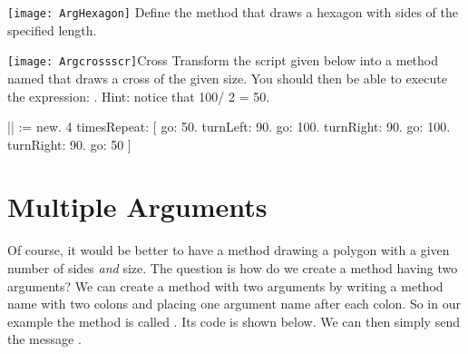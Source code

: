 \begin{exofigwithsizeandtitle}[0.5]{\texttt{[image: ArgHexagon]}}{}
  Define the method  that draws \newcommand{\replace}[2]{an}{a} hexagon with \newcommand{\replace}[2]{side of a given size}{sides of the specified length}.
\end{exofigwithsizeandtitle}

\begin{exofigwithsizeandtitle}[0.5]{\texttt{[image: Argcrossscr]}}{Cross}
Transform the script given \newcommand{\replace}[2]{hereafter}{below} into a method named  that draws a cross of \newcommand{\replace}[2]{a}{the} given size. You should then be able to execute the \newcommand{\remove}[1]{following} expression: . Hint: notice that 100/ 2 = 50.
\begin{nalltt}
|\caro|
\caro := \Turtle new.
4 timesRepeat: 
               [ \caro go: 50. 
               \caro turnLeft: 90. 
               \caro go: 100. 
               \caro turnRight: 90. 
               \caro go: 100.
               \caro turnRight: 90.
               \caro go: 50 ]

\end{nalltt}
\end{exofigwithsizeandtitle}



\section{Multiple Arguments}
Of course, it would be \newcommand{\replace}[2]{best}{better} to have a method drawing a polygon \newcommand{\replace}[2]{of}{with a} given number of sides
\emph{and} size. The \newcommand{\replace}[2]{problem}{question} is how \newcommand{\replace}[2]{to}{do we} create a method having two arguments\newcommand{\replace}[2]{?Creating}{?  We can create} a method with two arguments \newcommand{\remove}[1]{is obtained} by writing a method name with two colons and placing \newcommand{\replace}[2]{the}{one} argument \newcommand{\replace}[2]{names}{name} after each colon.
\newcommand{\replace}[2]{Thus,}{So} in our \newcommand{\replace}[2]{case}{example} the method is called . Its code is shown below. We can then simply send the message .


